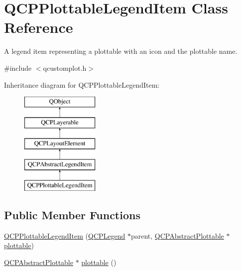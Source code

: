 \hypertarget{class_q_c_p_plottable_legend_item}{}\section{Q\+C\+P\+Plottable\+Legend\+Item Class Reference}
\label{class_q_c_p_plottable_legend_item}


A legend item representing a plottable with an icon and the plottable name.  




{\ttfamily \#include $<$qcustomplot.\+h$>$}

Inheritance diagram for Q\+C\+P\+Plottable\+Legend\+Item\+:\begin{figure}[H]
\begin{center}
\leavevmode
\includegraphics[height=5.000000cm]{da/d24/class_q_c_p_plottable_legend_item}
\end{center}
\end{figure}
\subsection*{Public Member Functions}
\begin{DoxyCompactItemize}
\item 
\mbox{\hyperlink{class_q_c_p_plottable_legend_item_ac1072591fe409d3dabad51b23ee4d6c5}{Q\+C\+P\+Plottable\+Legend\+Item}} (\mbox{\hyperlink{class_q_c_p_legend}{Q\+C\+P\+Legend}} $\ast$parent, \mbox{\hyperlink{class_q_c_p_abstract_plottable}{Q\+C\+P\+Abstract\+Plottable}} $\ast$\mbox{\hyperlink{class_q_c_p_plottable_legend_item_af29e9a2c60b4cba0cac2447b8af7b488}{plottable}})
\item 
\mbox{\hyperlink{class_q_c_p_abstract_plottable}{Q\+C\+P\+Abstract\+Plottable}} $\ast$ \mbox{\hyperlink{class_q_c_p_plottable_legend_item_af29e9a2c60b4cba0cac2447b8af7b488}{plottable}} ()
\end{DoxyCompactItemize}
